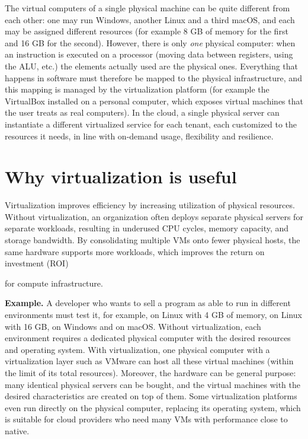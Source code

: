 The virtual computers of a single physical machine can be quite different from each other: one may run Windows, another Linux and a third macOS, and each may be assigned different resources (for example 8 GB of memory for the first and 16 GB for the second). However, there is only \emph{one} physical computer: when an instruction is executed on a processor (moving data between registers, using the ALU, etc.) the elements actually used are the physical ones. Everything that happens in software must therefore be mapped to the physical infrastructure, and this mapping is managed by the virtualization platform (for example the VirtualBox installed on a personal computer, which exposes virtual machines that the user treats as real computers). In the cloud, a single physical server can instantiate a different virtualized service for each tenant, each customized to the resources it needs, in line with on-demand usage, flexibility and resilience.

\section{Why virtualization is useful}

Virtualization improves efficiency by increasing utilization of physical resources. Without virtualization, an organization often deploys separate physical servers for separate workloads, resulting in underused CPU cycles, memory capacity, and storage bandwidth. By consolidating multiple VMs onto fewer physical hosts, the same hardware supports more workloads, which improves the return on investment (ROI)

for compute infrastructure.

\textbf{Example.} A developer who wants to sell a program as able to run in different environments must test it, for example, on Linux with 4 GB of memory, on Linux with 16 GB, on Windows and on macOS. Without virtualization, each environment requires a dedicated physical computer with the desired resources and operating system. With virtualization, one physical computer with a virtualization layer such as VMware can host all these virtual machines (within the limit of its total resources). Moreover, the hardware can be general purpose: many identical physical servers can be bought, and the virtual machines with the desired characteristics are created on top of them. Some virtualization platforms even run directly on the physical computer, replacing its operating system, which is suitable for cloud providers who need many VMs with performance close to native.

